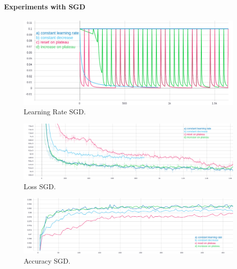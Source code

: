 \paragraph{Experiments with SGD}
\begin{figure}[H]
    \centering
    \includegraphics[width=\textwidth,height=\textheight,keepaspectratio]{img/learning_rate2.png}
    \decoRule
    \caption[Learning Rate SGD]{Learning Rate SGD.}
    \label{fig:sgd-learning-rate}
\end{figure}

\begin{figure}[H]
    \centering
    \includegraphics[width=\textwidth,height=\textheight,keepaspectratio]{img/loss_sgd.png}
    \decoRule
    \caption[Loss SGD]{Loss SGD.}
    \label{fig:sgd-loss}
\end{figure}

\begin{figure}[H]
    \centering
    \includegraphics[width=\textwidth,height=\textheight,keepaspectratio]{img/accuracy_sgd.png}
    \decoRule
    \caption[Accuracy SGD]{Accuracy SGD.}
    \label{fig:sgd-accuracy}
\end{figure}

